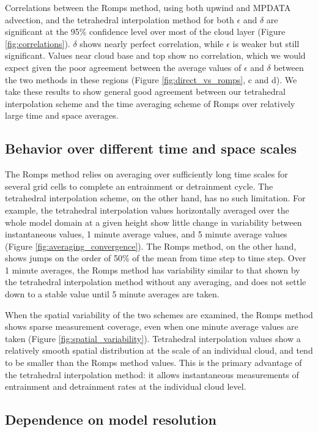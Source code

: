 \documentclass[12pt]{article}
\begin{document}
Correlations between the Romps method, using both upwind and MPDATA advection, 
and the tetrahedral interpolation method for both $\epsilon$ and $\delta$ are 
significant at the 95\% confidence level over most of the cloud layer (Figure 
\ref{fig:correlations}).  $\delta$ shows nearly perfect correlation, while 
$\epsilon$ is weaker but still significant.  Values near cloud base and top 
show no correlation, which we would expect given the poor agreement between the 
average values of $\epsilon$ and $\delta$ between the two methods in these 
regions (Figure \ref{fig:direct_vs_romps}, c and d).  We take these results to 
show general good agreement between our tetrahedral interpolation scheme and 
the time averaging scheme of Romps over relatively large time and space 
averages.

\subsection{Behavior over different time and space scales}

The Romps method relies on averaging over sufficiently long time scales for 
several grid cells to complete an entrainment or detrainment cycle.  The 
tetrahedral interpolation scheme, on the other hand, has no such limitation.  
For example, the tetrahedral interpolation values horizontally averaged over 
the whole model domain at a given height show little change in variability 
between instantaneous values, 1 minute average values, and 5 minute average 
values (Figure \ref{fig:averaging_convergence}).  The Romps method, on the 
other hand, shows jumps on the order of 50\% of the mean from time step to 
time step.  Over 1 minute averages, the Romps method has variability 
similar to that shown by the tetrahedral interpolation method without any 
averaging, and does not settle down to a stable value until 5 minute averages 
are taken.

When the spatial variability of the two schemes are examined, the Romps 
method shows sparse measurement coverage, even when one minute average values 
are taken (Figure \ref{fig:spatial_variability}).  Tetrahedral interpolation 
values show a relatively smooth spatial distribution at the scale of an 
individual cloud, and tend to be smaller than the Romps method values.  
This is the primary advantage of the tetrahedral interpolation method: it 
allows instantaneous measurements of entrainment and detrainment rates at the 
individual cloud level.

\subsection{Dependence on model resolution}
\end{document}
